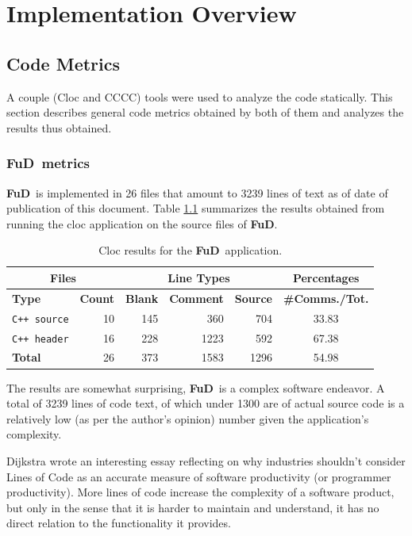 \documentclass[a4paper,12pt,english]{report}
\newcommand{\fud}{\textbf{FuD}}
\begin{document}
\chapter{Implementation Overview}

\section{Code Metrics}

A couple (Cloc and CCCC) tools were used to analyze the code statically. This section describes general code metrics obtained by both of them and analyzes the results thus obtained.

\subsection{\fud \ metrics}

\fud \ is implemented in 26 files that amount to 3239 lines of text as of date of publication of this document. Table \ref{clocfud} summarizes the results obtained from running the cloc application on the source files of \fud.

\begin{table}[!htf]
\begin{center}
\begin{tabular}{|l|r|r|r|r|c|}
\hline
\multicolumn{2}{|c|}{Files} & \multicolumn{3}{|c|}{Line Types} & Percentages \\
\hline
\textbf{Type} & \textbf{Count} & \textbf{Blank} & \textbf{Comment} & \textbf{Source} & \small{\textbf{\#Comms./Tot.}}\\
\hline
\texttt{C++ source} & 10   &    145  &     360   &    704 & 33.83 \\
\hline
\texttt{C++ header} & 16   &    228  &    1223   &    592 &  67.38 \\
\hline
\textbf{Total}      &  26  &     373 &     1583  &    1296 & 54.98 \\
\hline
\end{tabular}
\caption{Cloc results for the \fud \ application.} \label{clocfud}
\end{center}
\end{table}

The results are somewhat surprising, \fud \ is a complex software endeavor. A total of 3239 lines of code text, of which under 1300 are of actual source code is a relatively low (as per the author's opinion) number given the application's complexity.

Dijkstra wrote an interesting essay\cite{ewd1036} reflecting on why industries shouldn't consider Lines of Code as an accurate measure of software productivity (or programmer productivity). More lines of code increase the complexity of a software product, but only in the sense that it is harder to maintain and understand, it has no direct relation to the functionality it provides.
\end{document}
